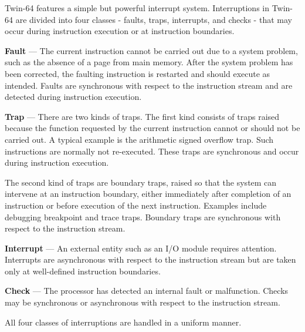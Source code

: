%
%

Twin-64 features a simple but powerful interrupt system. Interruptions in Twin-64 are divided into four classes - faults, traps, interrupts, and checks - that may occur during instruction execution or at instruction boundaries.

\begin{smallGapItemize}
\item \textbf{Fault} --- The current instruction cannot be carried out due to a system problem, such as the absence of a page from main memory. After the system problem has been corrected, the faulting instruction is restarted and should execute as intended. Faults are synchronous with respect to the instruction stream and are detected during instruction execution.

\item \textbf{Trap} --- There are two kinds of traps. The first kind consists of traps raised because the function requested by the current instruction cannot or should not be carried out. A typical example is the arithmetic signed overflow trap. Such instructions are normally not re-executed. These traps are synchronous and occur during instruction execution.

The second kind of traps are boundary traps, raised so that the system can intervene at an instruction boundary, either immediately after completion of an instruction or before execution of the next instruction. Examples include debugging breakpoint and trace traps. Boundary traps are synchronous with respect to the instruction stream.

\item \textbf{Interrupt} --- An external entity such as an I/O module requires attention. Interrupts are asynchronous with respect to the instruction stream but are taken only at well-defined instruction boundaries.

\item \textbf{Check} --- The processor has detected an internal fault or malfunction. Checks may be synchronous or asynchronous with respect to the instruction stream.
\end{smallGapItemize}

All four classes of interruptions are handled in a uniform manner.


